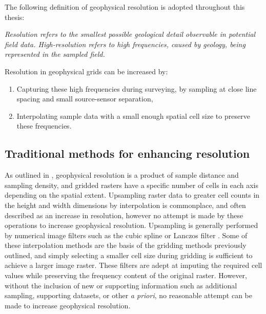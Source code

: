 The following definition of geophysical resolution is adopted throughout this thesis:

\bigskip{}
\noindent{}\emph{Resolution refers to the smallest possible geological detail observable in potential field data. High-resolution refers to high frequencies, caused by geology, being represented in the sampled field.}

\bigskip{}
Resolution in geophysical grids can be increased by:
\begin{enumerate}
    \item{} Capturing these high frequencies during surveying, by sampling at close line spacing and small source-sensor separation,
    \item{} Interpolating sample data with a small enough spatial cell size to preserve these frequencies.
\end{enumerate}

%

\subsection{Traditional methods for enhancing resolution}
As outlined in , geophysical resolution is a product of sample distance and sampling density, and gridded rasters have a specific number of cells in each axis depending on the spatial extent.
Upsampling raster data to greater cell counts in the height and width dimensions by interpolation is commonplace, and often described as an increase in resolution, however no attempt is made by these operations to increase geophysical resolution.
Upsampling is generally performed by numerical image filters such as the cubic spline \parencite{keysCubicConvolutionInterpolation1981} or Lanczos filter \parencite{lanczos1988applied}.
Some of these interpolation methods are the basis of the gridding methods previously outlined, and simply selecting a smaller cell size during gridding is sufficient to achieve a larger image raster.
These filters are adept at imputing the required cell values while preserving the frequency content of the original raster.
However, without the inclusion of new or supporting information such as additional sampling, supporting datasets, or other \emph{a priori}, no reasonable attempt can be made to increase geophysical resolution.

